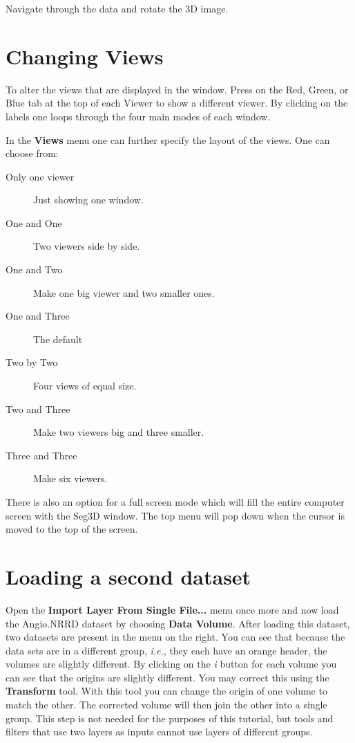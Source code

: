 \documentclass[fleqn,11pt,openany]{book}
\begin{document}
Navigate through the data and rotate the 3D image.

\section{Changing Views}

To alter the views that are displayed in the window. Press on the Red, Green, or Blue tab at the top of each Viewer to show a different viewer. By clicking on the labels one loops through the four main modes of each window.

In the {\bf Views} menu one can further specify the layout of the views. One can choose from:

\begin{description}
\item[Only one viewer] Just showing one window.
\item[One and One] Two viewers side by side.
\item[One and Two] Make one big viewer and two smaller ones.
\item[One and Three] The default
\item[Two by Two]  Four views of equal size.
\item[Two and Three] Make two viewers big and three smaller.
\item[Three and Three] Make six viewers.
\end{description}


There is also an option for a full screen mode which will fill the entire computer screen with the Seg3D window. The top menu will pop down when the cursor is moved to the top of the screen.

\section{Loading a second dataset}

Open the {\bf Import Layer From Single File...} menu once more and now load the Angio.NRRD dataset by choosing \textbf {Data Volume}.
After loading this dataset, two datasets are present in the menu on the right.  You can see that because the data sets are in a different group, \emph{i.e.}, they each have an orange header, the volumes are slightly different.  By clicking on the \emph{i} button for each volume you can see that the origins are slightly different.  You may correct this using the {\bf Transform} tool.  With this tool you can change the origin of one volume to match the other. The corrected volume will then join the other into a single group. This step is not needed for  the purposes of this tutorial, but tools and filters that use two layers as inputs cannot use layers of different groups.  
\end{document}
